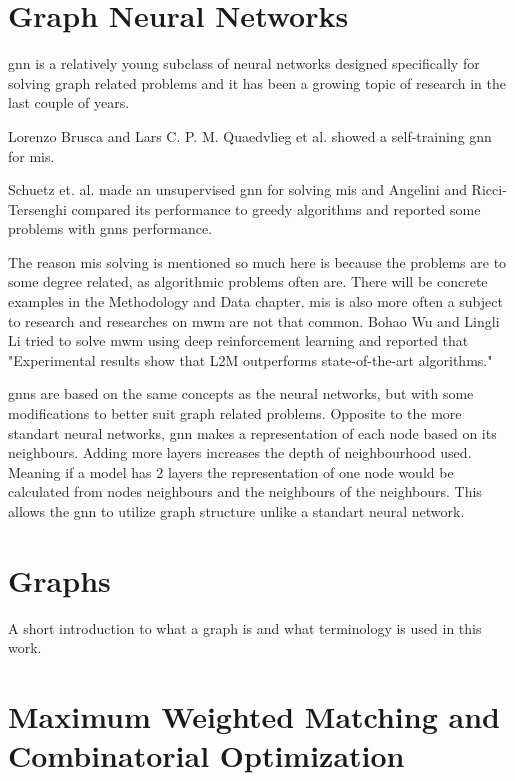 \section{Graph Neural Networks}

\gls{gnn} is a relatively young subclass of neural networks designed specifically for solving graph related problems and it has been a growing topic of research in the last couple of years.

Lorenzo Brusca and Lars C. P. M. Quaedvlieg et al. \cite{brusca2023maximum} showed a self-training \gls{gnn} for \gls{mis}. 

Schuetz et. al. made an unsupervised \gls{gnn} \cite{Schuetz2022} for solving \gls{mis} and Angelini and Ricci-Tersenghi \cite{Angelini2022} compared  its performance to greedy algorithms and reported some problems with \gls{gnn}s performance.

The reason \gls{mis} solving is mentioned so much here is because the problems are to some degree related, as algorithmic problems often are. There will be concrete examples in the Methodology and Data chapter. \gls{mis} is also more often a subject to research and researches on \gls{mwm} are not that common. Bohao Wu and Lingli Li tried to solve \gls{mwm} using deep reinforcement learning \cite{WU2022400} and reported that "Experimental results show that L2M outperforms state-of-the-art algorithms."

\gls{gnn}s are based on the same concepts as the neural networks, but with some modifications to better suit graph related problems. Opposite to the more standart neural networks, \gls{gnn} makes a representation of each node based on its neighbours. Adding more layers increases the depth of neighbourhood used. Meaning if a model has 2 layers the representation of one node would be calculated from nodes neighbours and the neighbours of the neighbours. This allows the \gls{gnn} to utilize graph structure unlike a standart neural network.

\section{Graphs}

A short introduction to what a graph is and what terminology is used in this work.

\section{Maximum Weighted Matching and Combinatorial Optimization}

